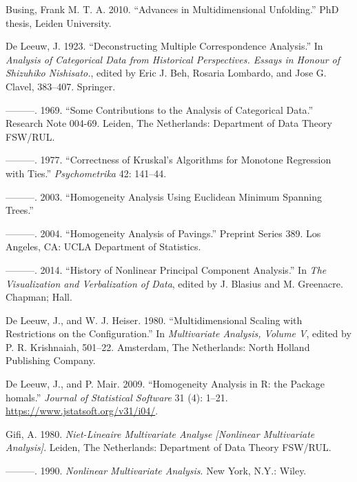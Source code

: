 \documentclass[
  12pt,
]{article}
\newlength{\cslhangindent}
\newenvironment{CSLReferences}[2] %
 {\begin{list}{}{%
  \setlength{\itemindent}{0pt}
  \setlength{\leftmargin}{0pt}
  \setlength{\parsep}{0pt}
  \ifodd #1
   \setlength{\leftmargin}{\cslhangindent}
   \setlength{\itemindent}{-1\cslhangindent}
  \fi
  \setlength{\itemsep}{#2\baselineskip}}}
 {\end{list}}
\begin{document}
\label{refs}
\begin{CSLReferences}{1}{0}
Busing, Frank M. T. A. 2010. {``Advances in Multidimensional Unfolding.''} PhD thesis, Leiden University.

De Leeuw, J. 1923. {``Deconstructing Multiple Correspondence Analysis.''} In \emph{Analysis of Categorical Data from Historical Perspectives. Essays in Honour of Shizuhiko Nishisato.}, edited by Eric J. Beh, Rosaria Lombardo, and Jose G. Clavel, 383--407. Springer.

---------. 1969. {``{Some Contributions to the Analysis of Categorical Data}.''} Research Note 004-69. Leiden, The Netherlands: Department of Data Theory FSW/RUL.

---------. 1977. {``Correctness of Kruskal's Algorithms for Monotone Regression with Ties.''} \emph{Psychometrika} 42: 141--44.

---------. 2003. {``{Homogeneity Analysis Using Euclidean Minimum Spanning Trees}.''}

---------. 2004. {``{Homogeneity Analysis of Pavings}.''} Preprint Series 389. Los Angeles, CA: UCLA Department of Statistics.

---------. 2014. {``{History of Nonlinear Principal Component Analysis}.''} In \emph{{The Visualization and Verbalization of Data}}, edited by J. Blasius and M. Greenacre. Chapman; Hall.

De Leeuw, J., and W. J. Heiser. 1980. {``Multidimensional Scaling with Restrictions on the Configuration.''} In \emph{Multivariate Analysis, Volume {V}}, edited by P. R. Krishnaiah, 501--22. Amsterdam, The Netherlands: North Holland Publishing Company.

De Leeuw, J., and P. Mair. 2009. {``{Homogeneity Analysis in {R}: the Package homals}.''} \emph{Journal of Statistical Software} 31 (4): 1--21. \url{https://www.jstatsoft.org/v31/i04/}.

Gifi, A. 1980. \emph{Niet-Lineaire Multivariate Analyse {[}Nonlinear Multivariate Analysis{]}}. Leiden, The Netherlands: Department of Data Theory FSW/RUL.

---------. 1990. \emph{Nonlinear Multivariate Analysis}. New York, N.Y.: Wiley.


\end{CSLReferences}
\end{document}
